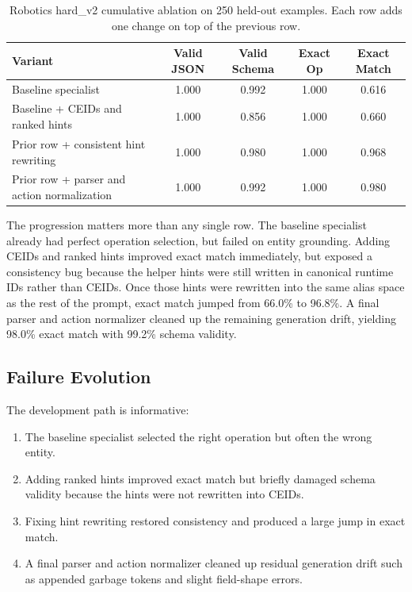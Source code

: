 \documentclass[11pt]{article}
\begin{document}
\begin{table}[t]
\centering
\caption{Robotics hard\_v2 cumulative ablation on 250 held-out examples. Each row adds one change on top of the previous row.}
\label{tab:robotics-hard-v2-results}
\begin{tabular}{lcccc}
\toprule
Variant & Valid JSON & Valid Schema & Exact Op & Exact Match \\
\midrule
Baseline specialist & 1.000 & 0.992 & 1.000 & 0.616 \\
Baseline + CEIDs and ranked hints & 1.000 & 0.856 & 1.000 & 0.660 \\
Prior row + consistent hint rewriting & 1.000 & 0.980 & 1.000 & 0.968 \\
Prior row + parser and action normalization & 1.000 & 0.992 & 1.000 & 0.980 \\
\bottomrule
\end{tabular}
\end{table}

The progression matters more than any single row. The baseline specialist already had perfect operation selection, but failed on entity grounding. Adding CEIDs and ranked hints improved exact match immediately, but exposed a consistency bug because the helper hints were still written in canonical runtime IDs rather than CEIDs. Once those hints were rewritten into the same alias space as the rest of the prompt, exact match jumped from 66.0\% to 96.8\%. A final parser and action normalizer cleaned up the remaining generation drift, yielding 98.0\% exact match with 99.2\% schema validity.

\subsection{Failure Evolution}
The development path is informative:
\begin{enumerate}[leftmargin=*,itemsep=0.25em]
  \item The baseline specialist selected the right operation but often the wrong entity.
  \item Adding ranked hints improved exact match but briefly damaged schema validity because the hints were not rewritten into CEIDs.
  \item Fixing hint rewriting restored consistency and produced a large jump in exact match.
  \item A final parser and action normalizer cleaned up residual generation drift such as appended garbage tokens and slight field-shape errors.
\end{enumerate}
\end{document}
